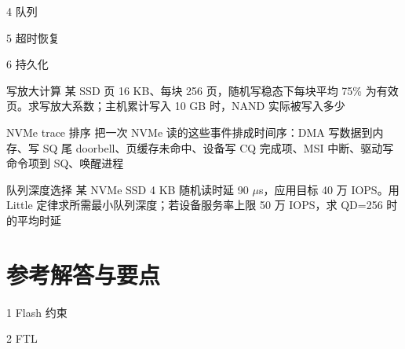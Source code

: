 \begin{chapterexercise}{4}
队列
\end{chapterexercise}

\begin{chapterexercise}{5}
超时恢复
\end{chapterexercise}

\begin{chapterexercise}{6}
持久化
\end{chapterexercise}

\begin{chapterexercise}{写放大计算}
某 SSD 页 16 KB、每块 256 页，随机写稳态下每块平均 75\% 为有效页。求写放大系数；主机累计写入 10 GB 时，NAND 实际被写入多少
\end{chapterexercise}

\begin{chapterexercise}{NVMe trace 排序}
把一次 NVMe 读的这些事件排成时间序：DMA 写数据到内存、写 SQ 尾 doorbell、页缓存未命中、设备写 CQ 完成项、MSI 中断、驱动写命令项到 SQ、唤醒进程
\end{chapterexercise}

\begin{chapterexercise}{队列深度选择}
某 NVMe SSD 4 KB 随机读时延 90 $\mu$s，应用目标 40 万 IOPS。用 Little 定律求所需最小队列深度；若设备服务率上限 50 万 IOPS，求 QD=256 时的平均时延
\end{chapterexercise}

\section*{参考解答与要点}

\begin{chapteranswer}{1}
Flash 约束
\end{chapteranswer}

\begin{chapteranswer}{2}
FTL
\end{chapteranswer}

